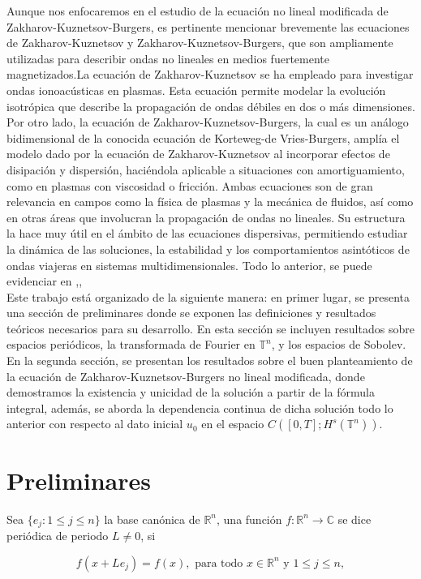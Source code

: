 \documentclass[12pt]{article}
\newcommand\R{\ensuremath{\mathbb{R}}}
\newcommand\T{\mathbb{T}}
\begin{document}
Aunque nos enfocaremos en el estudio de la ecuación no lineal modificada de Zakharov-Kuznetsov-Burgers, es pertinente mencionar brevemente las ecuaciones de Zakharov-Kuznetsov y Zakharov-Kuznetsov-Burgers, que son ampliamente utilizadas para describir ondas no lineales en medios fuertemente magnetizados.La ecuación de Zakharov-Kuznetsov se ha empleado para investigar ondas ionoacústicas en plasmas. Esta ecuación permite modelar la evolución isotrópica que describe la propagación de ondas débiles en dos o más dimensiones. Por otro lado, la ecuación de Zakharov-Kuznetsov-Burgers, la cual es un análogo bidimensional de la conocida ecuación de Korteweg-de Vries-Burgers, amplía el modelo dado por la ecuación de Zakharov-Kuznetsov  al incorporar efectos de disipación y dispersión, haciéndola aplicable a situaciones con amortiguamiento, como en plasmas con viscosidad o fricción. Ambas ecuaciones son de gran relevancia en campos como la física de plasmas y la mecánica de fluidos, así como en otras áreas que involucran la propagación de ondas no lineales. Su estructura la hace muy útil en el ámbito de las ecuaciones dispersivas, permitiendo estudiar la dinámica de las soluciones, la estabilidad y los comportamientos asintóticos de ondas viajeras en sistemas multidimensionales. Todo lo anterior, se puede evidenciar en \cite{texto1}\cite{texto2},\cite{texto3},\cite{texto4}\cite{texto5}\\

Este trabajo está organizado de la siguiente manera: en primer lugar, se presenta una sección de preliminares donde se exponen las definiciones y resultados teóricos necesarios para su desarrollo. En esta sección se incluyen resultados sobre espacios periódicos, la transformada de Fourier en $ \T^n$, y los espacios de Sobolev. En la segunda sección, se presentan los resultados sobre el buen planteamiento de la ecuación de Zakharov-Kuznetsov-Burgers no lineal modificada, donde demostramos la existencia y unicidad de la solución a partir de la fórmula integral, además, se aborda la dependencia continua de dicha solución todo lo anterior con respecto al dato inicial $ u_0$ en el espacio $C([0, T]; H^s(\T^n))$.







\section{Preliminares}

\begin{definition}
 Sea $\{e_j:  1\leq j\leq n\}$ la base canónica de $\R^n$, una función $f: \mathbb{R}^n \rightarrow \mathbb{C}$ se dice periódica de periodo $L \neq 0$, si

$$
f(x+L e_j)=f(x), \text { para todo } x \in \mathbb{R}^n \text{ y } 1\leq j\leq n, 
$$


\end{definition}
\end{document}
